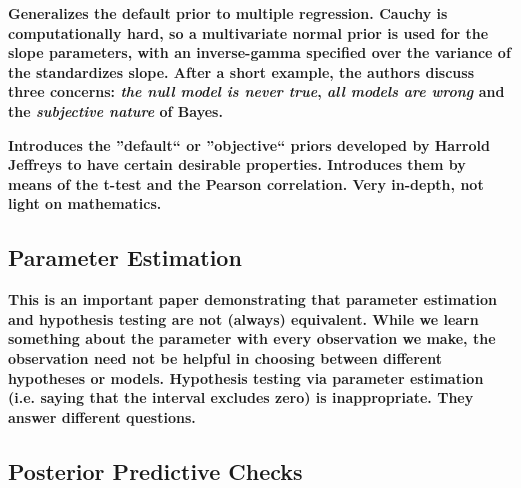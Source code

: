 \documentclass[12pt]{scrartcl}
\begin{document}
\begin{description}
  \textbf{Generalizes the default prior to multiple regression. Cauchy is computationally hard, so a multivariate normal prior is used for the slope parameters, with an inverse-gamma specified over the variance of the standardizes slope. After a short example, the authors discuss three concerns: \emph{the null model is never true}, \emph{all models are wrong} and the \emph{subjective nature} of Bayes.}
  
  \item {}
  \item {}
  \item {}
  
  \textbf{Introduces the ''default`` or ''objective`` priors developed by Harrold Jeffreys to have certain desirable properties. Introduces them by means of the t-test and the Pearson correlation. Very in-depth, not light on mathematics.}
\end{description}


\subsection{Parameter Estimation}
\begin{description}
  \item {}
  \item {}
  \item {}
  \item {}
  
  \textbf{This is an important paper demonstrating that parameter estimation and hypothesis testing are not (always) equivalent. While we learn something about the parameter with every observation we make, the observation need not be helpful in choosing between different hypotheses or models. Hypothesis testing via parameter estimation (i.e. saying that the interval excludes zero) is inappropriate. They answer different questions.}
\end{description}

\subsection{Posterior Predictive Checks}
\begin{description}
    \item {}
    \item {}
    \item {}
\end{description}
\end{document}
